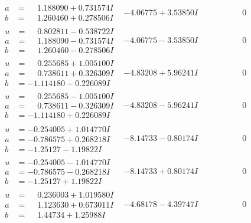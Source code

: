 \documentclass[1p]{elsarticle_modified}
\theoremstyle{definition}
\begin{document}
$$\begin{array}{c|c|c}
\begin{aligned}
a &= \phantom{-}1.188090 + 0.731574 I \\
b &= \phantom{-}1.260460 + 0.278506 I\end{aligned}
 & -4.06775 + 3.53850 I & \phantom{-0.000000 } 0 \\ \hline\begin{aligned}
u &= \phantom{-}0.802811 - 0.538722 I \\
a &= \phantom{-}1.188090 - 0.731574 I \\
b &= \phantom{-}1.260460 - 0.278506 I\end{aligned}
 & -4.06775 - 3.53850 I & \phantom{-0.000000 } 0 \\ \hline\begin{aligned}
u &= \phantom{-}0.255685 + 1.005100 I \\
a &= \phantom{-}0.738611 + 0.326309 I \\
b &= -1.114180 - 0.226089 I\end{aligned}
 & -4.83208 + 5.96241 I & \phantom{-0.000000 } 0 \\ \hline\begin{aligned}
u &= \phantom{-}0.255685 - 1.005100 I \\
a &= \phantom{-}0.738611 - 0.326309 I \\
b &= -1.114180 + 0.226089 I\end{aligned}
 & -4.83208 - 5.96241 I & \phantom{-0.000000 } 0 \\ \hline\begin{aligned}
u &= -0.254005 + 1.014770 I \\
a &= -0.786575 + 0.268218 I \\
b &= -1.25127 - 1.19822 I\end{aligned}
 & -8.14733 - 0.80174 I & \phantom{-0.000000 } 0 \\ \hline\begin{aligned}
u &= -0.254005 - 1.014770 I \\
a &= -0.786575 - 0.268218 I \\
b &= -1.25127 + 1.19822 I\end{aligned}
 & -8.14733 + 0.80174 I & \phantom{-0.000000 } 0 \\ \hline\begin{aligned}
u &= \phantom{-}0.236003 + 1.019580 I \\
a &= \phantom{-}1.123630 + 0.673011 I \\
b &= \phantom{-}1.44734 + 1.25988 I\end{aligned}
 & -4.68178 - 4.39747 I & \phantom{-0.000000 } 0 \\ \hline\begin{aligned}

\end{aligned}
\end{array}$$
\end{document}
